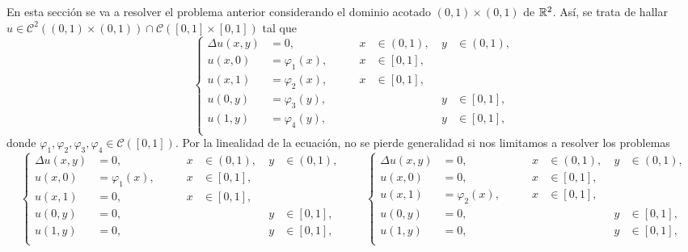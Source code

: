 \documentclass[a4paper, 12pt, extrafontsizes]{memoir}
\begin{document}
En esta sección se va a resolver el problema anterior considerando el dominio acotado $(0,1) \times (0,1)$ de $\mathbb R^2$. Así, se trata de hallar $u \in \mathcal{C}^2((0,1) \times (0,1)) \cap \mathcal{C}([0,1] \times [0,1])$ tal que
\[\left\{\begin{alignedat}{5}
    \Delta u(x,y) &= 0, \qquad & x &\in (0,1), \ & y &\in (0,1), \\
    u(x,0) &= \varphi_1(x), \qquad & x &\in [0,1], & & \\
    u(x,1) &= \varphi_2(x), \qquad & x &\in [0,1], & & \\
    u(0,y) &= \varphi_3(y), \qquad & & & y &\in [0,1], \\
    u(1,y) &= \varphi_4(y), \qquad & & & y &\in [0,1], \\
\end{alignedat}\right.\]
donde $\varphi_1,\varphi_2,\varphi_3,\varphi_4 \in \mathcal{C}([0,1])$. Por la linealidad de la ecuación, no se pierde generalidad si nos limitamos a resolver los problemas
\[\left\{\begin{alignedat}{5}
    \Delta u(x,y) &= 0, \qquad & x &\in (0,1), \ & y &\in (0,1), \\
    u(x,0) &= \varphi_1(x), \qquad & x &\in [0,1], & & \\
    u(x,1) &= 0, \qquad & x &\in [0,1], & & \\
    u(0,y) &= 0, \qquad & & & y &\in [0,1], \\
    u(1,y) &= 0, \qquad & & & y &\in [0,1], \\
\end{alignedat}\right. \qquad \left\{\begin{alignedat}{5}
    \Delta u(x,y) &= 0, \qquad & x &\in (0,1), \ & y &\in (0,1), \\
    u(x,0) &= 0, \qquad & x &\in [0,1], & & \\
    u(x,1) &= \varphi_2(x), \qquad & x &\in [0,1], & & \\
    u(0,y) &= 0, \qquad & & & y &\in [0,1], \\
    u(1,y) &= 0, \qquad & & & y &\in [0,1], \\
\end{alignedat}\right.\]
\end{document}

